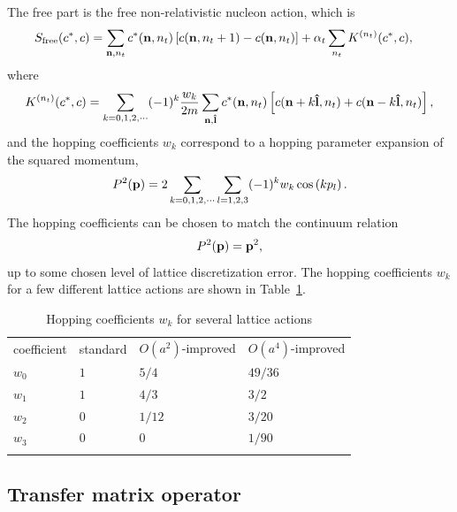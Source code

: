 The free part is the free non-relativistic nucleon action, which is 
\begin{align}
S_{\text{free}}(c^{\ast},c)  &  =\sum_{{\bf n},n_t
}  c_{}^{\ast}({\bf n},n_t) \left[ c({\bf n},n_t+1)-c({\bf n},n_t)\right]
+\alpha_t \sum_{n_t} K^{(n_t)}(c^*,c),
\end{align}
where
\begin{align}
K^{(n_t)}(c^*,c) =\sum_{k=0,1,2,\cdots} (-1)^k \frac{w_k}{2m} \sum_{{\bf
n},{\bf \hat{l}}} c^{\ast}({\bf n},n_t) \left[ c({\bf n}+k{\bf\hat{l}},n_t)
+ c({\bf n}-k{\bf \hat{l}},n_t)\right], 
\end{align}
and the hopping coefficients $w_k$ correspond to a hopping parameter expansion
of the squared momentum,
\begin{align}
P^2({\bf p})=2\sum_{k=0,1,2,\cdots}\sum_{l=1,2,3}%
(-1)^{k}w_{k}\cos\left(kp_{l}\right).
\end{align}
The hopping coefficients can be chosen to match the continuum  relation 
\begin{align}
P^2({\bf p})={\bf p}^2,
\end{align}
up to some chosen level of lattice discretization error.  The hopping coefficients
$w_k$ for a few different lattice actions are shown in Table~\ref{hopping_coeff}.

\begin{table}[tbh]
\caption{Hopping coefficients $w_k$ for several lattice actions}%
\label{hopping_coeff}%
\begin{center}
\begin{tabular}{p{2cm}p{3cm}p{3cm}p{3cm}}
\hline\noalign{\smallskip}
coefficient& standard & $O(a^{2})$-improved & $O(a^{4})$-improved \\
\noalign{\smallskip}\svhline\noalign{\smallskip}
$w_{0}$ & $1$ & $5/4$ & $49/36$\\
$w_{1}$ & $1$ & $4/3$ & $3/2$\\
$w_{2}$ & $0$ & $1/12$ & $3/20$\\
$w_{3}$ & $0$ & $0$ & $1/90$\\
\noalign{\smallskip}\hline\noalign{\smallskip}
\end{tabular}
\end{center}
\end{table}


\subsection{Transfer matrix operator}


